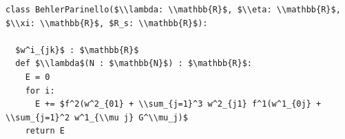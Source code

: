 \documentclass[border=10pt]{standalone}
\begin{document}
\begin{lstlisting}
class BehlerParinello($\\lambda: \\mathbb{R}$, $\\eta: \\mathbb{R}$, $\\xi: \\mathbb{R}$, $R_s: \\mathbb{R}$):

  $w^i_{jk}$ : $\mathbb{R}$
  def $\\lambda$(N : $\mathbb{N}$) : $\mathbb{R}$:
    E = 0
    for i:
      E += $f^2(w^2_{01} + \\sum_{j=1}^3 w^2_{j1} f^1(w^1_{0j} + \\sum_{j=1}^2 w^1_{\\mu j} G^\\mu_j)$
    return E
\end{lstlisting}
\end{document}
